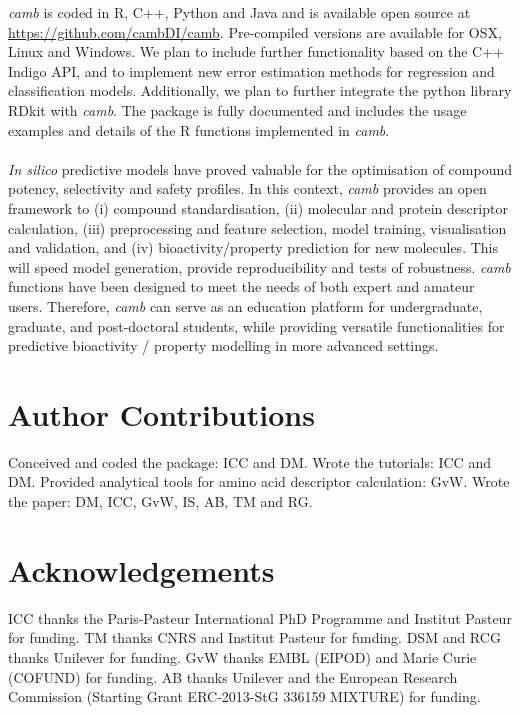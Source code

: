 \documentclass[twoside,a4wide,10pt]{article}
\begin{document}
{\it camb} is coded in R, C++, Python and Java and is available open source
at \url{https://github.com/cambDI/camb}.
Pre-compiled versions are available for OSX, Linux and Windows.
We plan to include further functionality based on the C++ Indigo API,
and to implement new error estimation methods for regression and classification models.
Additionally, we plan to further integrate the python library RDkit with {\it camb}.
The package is fully documented and includes the usage examples and details of the R functions implemented in {\it camb}.\\
\\
{\it In silico} predictive models have proved valuable
for the optimisation of compound potency, selectivity and safety profiles.
In this context, {\it camb} provides an open framework
to (i) compound standardisation, (ii) molecular and protein descriptor calculation,
(iii) preprocessing and feature selection, model training, visualisation and validation, and 
(iv) bioactivity/property prediction for new molecules.
This will speed model generation, provide reproducibility and tests of robustness.
{\it camb} functions have been designed to meet the needs of both expert and amateur users. 
Therefore, {\it camb} can serve as an education platform for 
undergraduate, graduate, and post-doctoral students,
while providing versatile functionalities for predictive bioactivity / property modelling
in more advanced settings.

\section*{{\bf Author Contributions}}

Conceived and coded the package: ICC and DM.
Wrote the tutorials: ICC and DM.
Provided analytical tools for amino acid descriptor calculation: GvW.
Wrote the paper: DM, ICC, GvW, IS, AB, TM and RG.

\section*{{\bf Acknowledgements}}
ICC thanks the Paris-Pasteur International PhD Programme and Institut Pasteur for funding.
TM thanks CNRS and Institut Pasteur for funding.
DSM and RCG thanks Unilever for funding.
GvW thanks EMBL (EIPOD) and Marie Curie (COFUND) for funding.
AB thanks Unilever and the European Research Commission (Starting Grant ERC-2013-StG 336159 MIXTURE) for funding.
\end{document}
